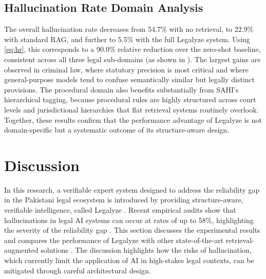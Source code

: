 \subsection{Hallucination Rate Domain Analysis}

The overall hallucination rate decreases from 54.7\% with no retrieval, to 22.9\% with
standard RAG, and further to 5.5\% with the full Legalyze system. Using \cref{eq:hr},
this corresponds to a 90.0\% relative reduction over the zero-shot baseline, consistent
across all three legal sub-domains (as shown in ). The largest gains are
observed in criminal law, where statutory precision is most critical and where
general-purpose models tend to confuse semantically similar but legally distinct
provisions. The procedural domain also benefits substantially from SAHI's hierarchical
tagging, because procedural rules are highly structured across court levels and
jurisdictional hierarchies that flat retrieval systems routinely overlook. Together,
these results confirm that the performance advantage of Legalyze is not domain-specific
but a systematic outcome of its structure-aware design.


\section{Discussion}
\label{sec:discussion}

\hspace*{2em}In this research, a verifiable expert system designed to address the
reliability gap in the Pakistani legal ecosystem is introduced by providing
structure-aware, verifiable intelligence, called Legalyze \cite{r605}. Recent empirical
audits show that hallucinations in legal AI systems can occur at rates of up to 58\%,
highlighting the severity of the reliability gap \cite{r40}. This section discusses the
experimental results and compares the performance of Legalyze with other state-of-the-art
retrieval-augmented solutions \cite{r40,r45}. The discussion highlights how the risks of
hallucination, which currently limit the application of AI in high-stakes legal contexts,
can be mitigated through careful architectural design.

